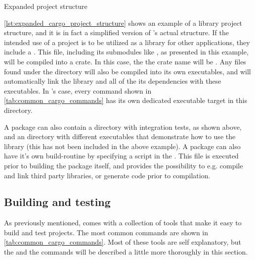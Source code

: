 \begin{listing}
\caption{Expanded {\cargo} project structure}
\label{lst:expanded_cargo_project_structure}
\end{listing}

\autoref{lst:expanded_cargo_project_structure} shows an example of a library project structure, and it is in fact a simplified version of {\cargo}'s actual structure.
If the intended use of a project is to be utilized as a library for other applications, they include a .
This file, including its submodules like , as presented in this example, will be compiled into a {\rust} crate.
In this case, the the crate name will be .
Any files found under the  directory will also be compiled into its own executables, and {\cargo} will automatically link the library and all of the its dependencies with these executables.
In {\cargo}'s case, every command shown in \autoref{tab:common_cargo_commands} has its own dedicated executable target in this directory.

A package can also contain a  directory with integration tests, as shown above, and an  directory with different executables that demonstrate how to use the library (this has not been included in the above example).
A package can also have it's own build-routine by specifying a  script in the .
This file is executed prior to building the package itself, and provides the possibility to e.g. compile and link third party {\C} libraries, or generate code prior to compilation.

\subsection{Building and testing}

As previously mentioned, {\cargo} comes with a collection of tools that make it easy to build and test {\rust} projects.
The most common commands are shown in \autoref{tab:common_cargo_commands}.
Most of these tools are self explanatory, but the  and the  commands will be described a little more thoroughly in this section.

